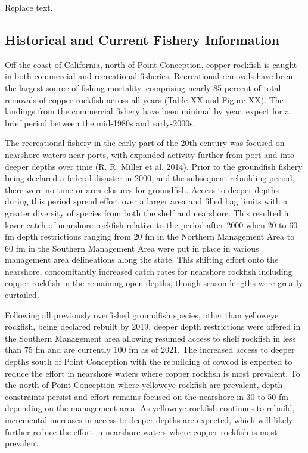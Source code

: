 \documentclass[11pt,
  english,
  letterpaper,
]{article}
\begin{document}
Replace text.

\hypertarget{historical-and-current-fishery-information}{%
\subsection{Historical and Current Fishery Information}\label{historical-and-current-fishery-information}}

Off the coast of California, north of Point Conception, copper rockfish is caught in both commercial and recreational fisheries. Recreational removals have been the largest source of fishing mortality, comprising nearly 85 percent of total removals of copper rockfish across all years (Table XX and Figure XX). The landings from the commercial fishery have been minimal by year, expect for a brief period between the mid-1980s and early-2000s.

The recreational fishery in the early part of the 20th century was focused on nearshore waters near ports, with expanded activity further from port and into deeper depths over time (R. R. Miller et al. 2014). Prior to the groundfish fishery being declared a federal disaster in 2000, and the subsequent rebuilding period, there were no time or area closures for groundfish. Access to deeper depths during this period spread effort over a larger area and filled bag limits with a greater diversity of species from both the shelf and nearshore. This resulted in lower catch of nearshore rockfish relative to the period after 2000 when 20 to 60 fm depth restrictions ranging from 20 fm in the Northern Management Area to 60 fm in the Southern Management Area were put in place in various management area delineations along the state. This shifting effort onto the nearshore, concomitantly increased catch rates for nearshore rockfish including copper rockfish in the remaining open depths, though season lengths were greatly curtailed.

Following all previously overfished groundfish species, other than yelloweye rockfish, being declared rebuilt by 2019, deeper depth restrictions were offered in the Southern Management area allowing resumed access to shelf rockfish in less than 75 fm and are currently 100 fm as of 2021. The increased access to deeper depths south of Point Conception with the rebuilding of cowcod is expected to reduce the effort in nearshore waters where copper rockfish is most prevalent. To the north of Point Conception where yelloweye rockfish are prevalent, depth constraints persist and effort remains focused on the nearshore in 30 to 50 fm depending on the management area. As yelloweye rockfish continues to rebuild, incremental increases in access to deeper depths are expected, which will likely further reduce the effort in nearshore waters where copper rockfish is most prevalent.
\end{document}
